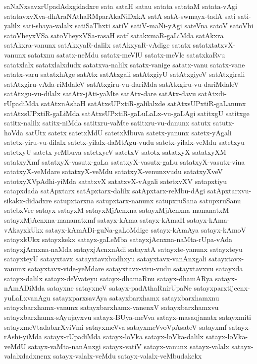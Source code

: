{saNaNxsavxrUpadAdxgidadxre
sata
sataH
satau
satata
satataM
satata-vAgi
satatavxvXva-dhAraNAthaRMparAkaNiDxkA
satA
satA-swmayx-tadA
sati
sati-yalilx
sati-shaya-valalx
satiSaThxti
satiV
satiV-maNi-yAgi
sateVna
satoV
satoVhi
satoVheyxVSa
satoVheyxVSa-rasaH
satf
satakxmaR-gaLiMda
satAkxra
satAkxra-vanunx
satAkxyaR-dalilx
satAkxyaR-vAdige
satatx
satatxtatxvX-vanunx
satatxnu
satatx-neMdu
satatx-meVlU
satatx-meVle
satatxkaRvu
satatxlalx
satatxlalxdudx
satatxva-nalilx
satatx-vanige
satatx-vanu
satatx-vane
satatx-varu
satatxhAge
satAtx
satAtxgali
satAtxgiyU
satAtxgiyeV
satAtxgirali
satAtxgiru-vAda-riMdaleV
satAtxgiru-vu-dariMda
satAtxgiru-vu-dariMdaleV
satAtxgu-vu-dilalx
satAtx-jAti-yaMte
satAtx-dare
satAtx-davu
satAtxdi-rUpadiMda
satAtxnAshaH
satAtxsUPxtiR-galilalxde
satAtxsUPxtiR-gaLanunx
satAtxsUPxtiR-gaLiMda
satAtxsUPxtiR-gaLuLaLx-vu-gaLAgi
satitxgU
satitxge
satitx-nalilx
satitx-niMda
satitxru-vaMte
satitxru-vu-danunx
satutx
satutx-hoVda
satUtx
satetx
satetxMdU
satetxMbuva
satetx-yanunx
satetx-yAgali
satetx-yiru-vu-dilalx
satetx-yilalx-daMtAgu-vudu
satetx-yilalx-veMdu
satetxyu
satetxyU
satetx-yeMbuva
satetxyeV
satetxV
satotx
satatxyX
satatxyXM
satatxyXmf
satatxyX-vasutx-gaLa
satatxyX-vasutx-gaLu
satatxyX-vasutx-vina
satatxyX-veMdare
satatxyX-veMdu
satatxyX-venunxvudu
satatxyXveV
satotxyXVpAdhi-yiMda
satatxvX
satatxvX-vAgali
satetxvXV
satapxtiyu
satapxdada
satApxtarx
satApxtarx-dalilx
satApxtarx-reMbu-dAgi
satApxtarxvu-sikakx-didadxre
satupxtarxna
satupxtarx-nanunx
satupxruSana
satupxruSanu
satebxVre
satayx
satayxM
satayxMjAcnxna
satayxMjAcnxna-mananatxM
satayxMjAcnxna-mananatxmf
satayx-kAma
satayx-kAmaH
satayx-kAma-vAkayxkUkx
satayx-kAmADi-guNa-gaLoMdige
satayx-kAmAya
satayx-kAmoV
satayxkUkx
satayxkekx
satayx-gaLeMba
satayxjAcnxna-naMta-rUpa-vAda
satayxjAcnxna-naMda
satayxjAcnxnAdi
satayxtA
satayxte-yanunx
satayxteyu
satayxteyU
satayxtavx
satayxtavxbudhxyu
satayxtavx-vanAnxgali
satayxtavx-vanunx
satayxtavx-vide-yeMdare
satayxtavx-viru-vudu
satayxtavxvu
satayxda
satayx-dalilx
satayx-deVvateyu
satayx-dhamaRnu
satayx-dhamARya
satayx-nAmADiMda
satayxne
satayxneV
satayx-padAthaRnirUpaNe
satayxparxtijecnx-yuLaLxvanAgu
satayxparxsavAya
satayxbarxhamx
satayxbarxhamxnu
satayxbarxhamx-vanunx
satayxbarxhamx-vanenxV
satayxbarxhamxvu
satayxbarxhamx-sAyujayxvu
satayx-BUya-meVva
satayx-masaqjanatx
satayxmiti
satayxmeVtadabxrXviVmi
satayxmeVva
satayxmeVvoVpAsateV
satayxmf
satayx-rAshi-yiMda
satayx-rUpadiMda
satayx-loVka
satayx-loVka-dalilx
satayx-loVka-veMdU
satayx-vaMta-nanAnxgi
satayx-vatiV
satayx-vanunx
satayx-valalx
satayx-valalxdadxnenx
satayx-valalx-veMdu
satayx-valalx-veMbudakekx
}
